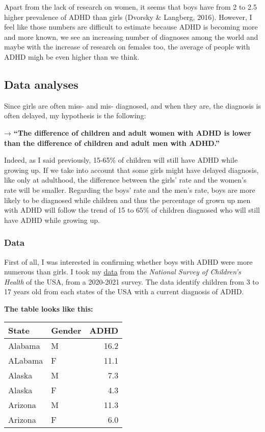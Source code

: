 \documentclass[
]{article}
\begin{document}
Apart from the lack of research on women, it seems that boys have from 2
to 2.5 higher prevalence of ADHD than girls (Dvorsky \& Langberg, 2016).
However, I feel like those numbers are difficult to estimate because
ADHD is becoming more and more known, we see an increasing number of
diagnoses among the world and maybe with the increase of research on
females too, the average of people with ADHD migh be even higher than we
think.

\hypertarget{data-analyses}{%
\subsection{Data analyses}\label{data-analyses}}

Since girls are often miss- and mis- diagnosed, and when they are, the
diagnosis is often delayed, my hypothesis is the following:

→ \textbf{``The difference of children and adult women with ADHD is
lower than the difference of children and adult men with ADHD.''}

Indeed, as I said previously, 15-65\% of children will still have ADHD
while growing up. If we take into account that some girls might have
delayed diagnosis, like only at adulthood, the difference between the
girls' rate and the women's rate will be smaller. Regarding the boys'
rate and the men's rate, boys are more likely to be diagnosed while
children and thus the percentage of grown up men with ADHD will follow
the trend of 15 to 65\% of children diagnosed who will still have ADHD
while growing up.

\hypertarget{data}{%
\subsubsection{Data}\label{data}}

First of all, I was interested in confirming whether boys with ADHD were
more numerous than girls. I took my
\href{https://www.childhealthdata.org/browse/survey/allstates?q=9343\&g=1008\&a=18062\#}{data}
from the \emph{National Survey of Children's Health} of the USA, from a
2020-2021 survey. The data identify children from 3 to 17 years old from
each states of the USA with a current diagnosis of ADHD.

\textbf{The table looks like this:}

\begin{longtable}[]{@{}llr@{}}
\toprule()
State & Gender & ADHD \\
\midrule()
\endhead
Alabama & M & 16.2 \\
ALabama & F & 11.1 \\
Alaska & M & 7.3 \\
Alaska & F & 4.3 \\
Arizona & M & 11.3 \\
Arizona & F & 6.0 \\
\bottomrule()
\end{longtable}
\end{document}
